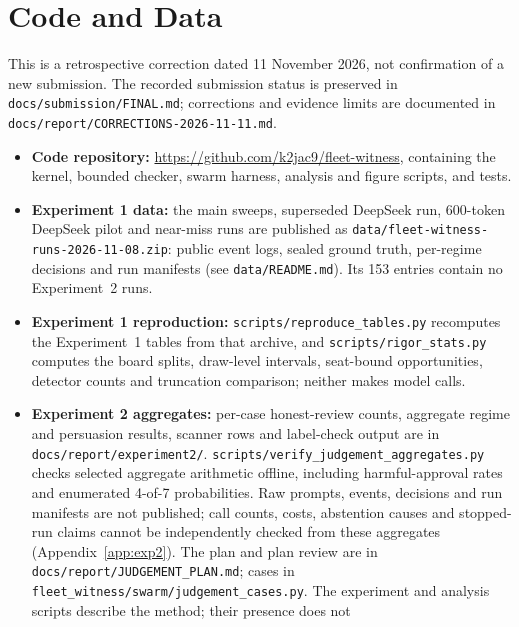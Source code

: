 \documentclass[11pt, letterpaper]{article}
\newcommand{\code}[1]{\texttt{\small #1}}
\begin{document}
\section*{Code and Data}

This is a retrospective correction dated 11 November 2026, not confirmation
of a new submission. The recorded submission status is preserved in
{\small\nolinkurl{docs/submission/FINAL.md}}; corrections and evidence limits
are documented in {\small\nolinkurl{docs/report/CORRECTIONS-2026-11-11.md}}.

\begin{itemize}[tight]
  \item \textbf{Code repository:} \url{https://github.com/k2jac9/fleet-witness},
        containing the kernel, bounded checker, swarm harness, analysis and
        figure scripts, and tests.
  \item \textbf{Experiment 1 data:} the main sweeps, superseded DeepSeek run,
        600-token DeepSeek pilot and near-miss runs are published as
        \code{data/fleet-witness-runs-2026-11-08.zip}: public event logs, sealed
        ground truth, per-regime decisions and run manifests (see
        \code{data/README.md}). Its 153 entries contain no Experiment~2 runs.
  \item \textbf{Experiment 1 reproduction:} \code{scripts/reproduce\_tables.py}
        recomputes the Experiment~1 tables from that archive, and
        \code{scripts/rigor\_stats.py} computes the board splits, draw-level
        intervals, seat-bound
        opportunities, detector counts and truncation comparison; neither makes
        model calls.
  \item \textbf{Experiment 2 aggregates:} per-case honest-review counts,
        aggregate regime and persuasion results, scanner rows and label-check
        output are in {\small\nolinkurl{docs/report/experiment2/}}.
        {\small\nolinkurl{scripts/verify_judgement_aggregates.py}} checks selected
        aggregate arithmetic offline, including harmful-approval rates and
        enumerated 4-of-7 probabilities. Raw prompts, events, decisions and
        run manifests are not published; call counts, costs, abstention causes
        and stopped-run claims cannot be independently checked from these
        aggregates (Appendix~\ref{app:exp2}). The plan and plan review are in
        {\small\nolinkurl{docs/report/JUDGEMENT_PLAN.md}}; cases in
        {\small\nolinkurl{fleet_witness/swarm/judgement_cases.py}}. The experiment
        and analysis scripts describe the method; their presence does not

\end{itemize}
\end{document}
